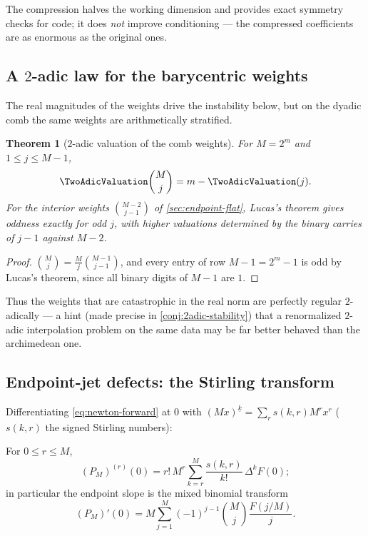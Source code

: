 \documentclass[11pt,oneside]{article}
\numberwithin{equation}{section}
\newtheorem{theorem}{Theorem}[section]
\theoremstyle{definition}
\theoremstyle{remark}
\newcommand{\fall}[2]{#1^{\underline{#2}}}
\begin{document}
The compression halves the working dimension and provides exact
symmetry checks for code; it does \emph{not} improve conditioning ---
the compressed coefficients are as enormous as the original ones.

\subsection{A $2$-adic law for the barycentric weights}

The real magnitudes of the weights drive the instability below, but on
the dyadic comb the same weights are arithmetically stratified.

\begin{theorem}[$2$-adic valuation of the comb weights]
\label{thm:weight-valuation}
For $M=2^{m}$ and $1\le j\le M-1$,
\begin{equation}
 \TwoAdicValuation\binom Mj=m-\TwoAdicValuation(j).
 \label{eq:weight-valuation}
\end{equation}
For the interior weights $\binom{M-2}{j-1}$ of
\cref{sec:endpoint-flat}, Lucas's theorem gives oddness exactly for
odd $j$, with higher valuations determined by the binary carries of
$j-1$ against $M-2$.
\end{theorem}

\begin{proof}
$\binom Mj=\frac Mj\binom{M-1}{j-1}$, and every entry of row
$M-1=2^{m}-1$ is odd by Lucas's theorem, since all binary digits of
$M-1$ are $1$.
\end{proof}

Thus the weights that are catastrophic in the real norm are perfectly
regular $2$-adically --- a hint (made precise in
\cref{conj:2adic-stability}) that a renormalized $2$-adic
interpolation problem on the same data may be far better behaved than
the archimedean one.

\subsection{Endpoint-jet defects: the Stirling transform}

Differentiating \eqref{eq:newton-forward} at $0$ with
$\fall{(Mx)}{k}=\sum_r s(k,r)M^{r}x^{r}$ ($s(k,r)$ the signed
Stirling numbers):

\begin{proposition}
\label{prop:jet-defect}
For $0\le r\le M$,
\begin{equation}
 (P_M)^{(r)}(0)
 =r!\,M^{r}\sum_{k=r}^{M}\frac{s(k,r)}{k!}\,\Delta^{k}F(0);
 \label{eq:jet-defect}
\end{equation}
in particular the endpoint slope is the mixed binomial transform
\begin{equation}
 (P_M)'(0)
 =M\sum_{j=1}^{M}(-1)^{j-1}\binom Mj\frac{F(j/M)}{j}.
 \label{eq:endpoint-slope}
\end{equation}
\end{proposition}
\end{document}
